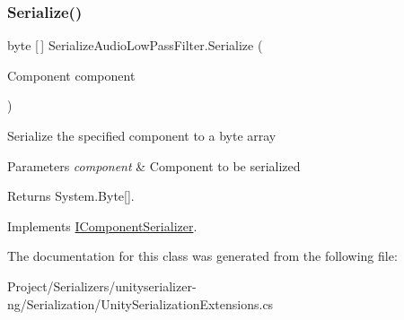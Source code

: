 \subsubsection{\texorpdfstring{Serialize()}{Serialize()}}
{\footnotesize\ttfamily byte \mbox{[}$\,$\mbox{]} Serialize\+Audio\+Low\+Pass\+Filter.\+Serialize (\begin{DoxyParamCaption}\item[{Component}]{component }\end{DoxyParamCaption})\hspace{0.3cm}{\ttfamily [inline]}}



Serialize the specified component to a byte array 


\begin{DoxyParams}{Parameters}
{\em component} & Component to be serialized\\
\hline
\end{DoxyParams}
\begin{DoxyReturn}{Returns}
System.\+Byte\mbox{[}\mbox{]}.
\end{DoxyReturn}


Implements \hyperlink{interface_i_component_serializer_ab2aa38005665496b62d6c54b5f0dbd31}{I\+Component\+Serializer}.



The documentation for this class was generated from the following file\+:\begin{DoxyCompactItemize}
\item 
Project/\+Serializers/unityserializer-\/ng/\+Serialization/Unity\+Serialization\+Extensions.\+cs\end{DoxyCompactItemize}
